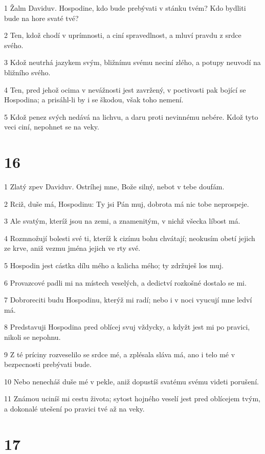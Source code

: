 \par 1 Žalm Daviduv. Hospodine, kdo bude prebývati v stánku tvém? Kdo bydliti bude na hore svaté tvé?
\par 2 Ten, kdož chodí v uprímnosti, a ciní spravedlnost, a mluví pravdu z srdce svého.
\par 3 Kdož neutrhá jazykem svým, bližnímu svému neciní zlého, a potupy neuvodí na bližního svého.
\par 4 Ten, pred jehož ocima v nevážnosti jest zavržený, v poctivosti pak bojící se Hospodina; a prisáhl-li by i se škodou, však toho nemení.
\par 5 Kdož penez svých nedává na lichvu, a daru proti nevinnému nebére. Kdož tyto veci ciní, nepohnet se na veky.

\chapter{16}

\par 1 Zlatý zpev Daviduv. Ostríhej mne, Bože silný, nebot v tebe doufám.
\par 2 Rciž, duše má, Hospodinu: Ty jsi Pán muj, dobrota má nic tobe neprospeje.
\par 3 Ale svatým, kteríž jsou na zemi, a znamenitým, v nichž všecka líbost má.
\par 4 Rozmnožují bolesti své ti, kteríž k cizímu bohu chvátají; neokusím obetí jejich ze krve, aniž vezmu jména jejich ve rty své.
\par 5 Hospodin jest cástka dílu mého a kalicha mého; ty zdržuješ los muj.
\par 6 Provazcové padli mi na místech veselých, a dedictví rozkošné dostalo se mi.
\par 7 Dobroreciti budu Hospodinu, kterýž mi radí; nebo i v noci vyucují mne ledví má.
\par 8 Predstavuji Hospodina pred oblícej svuj vždycky, a kdyžt jest mi po pravici, nikoli se nepohnu.
\par 9 Z té príciny rozveselilo se srdce mé, a zplésala sláva má, ano i telo mé v bezpecnosti prebývati bude.
\par 10 Nebo nenecháš duše mé v pekle, aniž dopustíš svatému svému videti porušení.
\par 11 Známou uciníš mi cestu života; sytost hojného veselí jest pred oblícejem tvým, a dokonalé utešení po pravici tvé až na veky.

\chapter{17}

